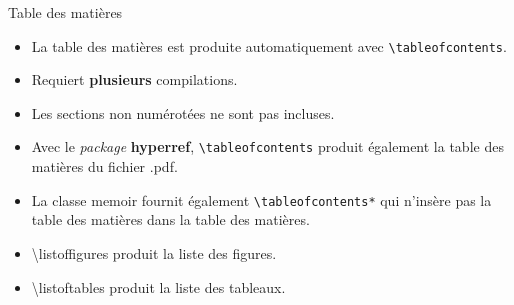 \begin{frame}[fragile,c]{Table des matières}
	
	\begin{itemize}
		\item La table des matières est produite automatiquement avec \lstinline|\tableofcontents|.
		\item Requiert \textbf{plusieurs} compilations.
		\item Les sections non numérotées ne sont pas incluses.
		\item Avec le \emph{package} \textbf{hyperref}, \lstinline|\tableofcontents| produit également la table des matières du fichier .pdf.
		\pause
		\item La classe memoir fournit également \lstinline|\tableofcontents*| qui n’insère pas la table des matières dans la table des matières.
		\pause
		\item \textbackslash listoffigures produit la liste des figures.
		\item \textbackslash listoftables produit la liste des tableaux.
	\end{itemize}

\end{frame}

